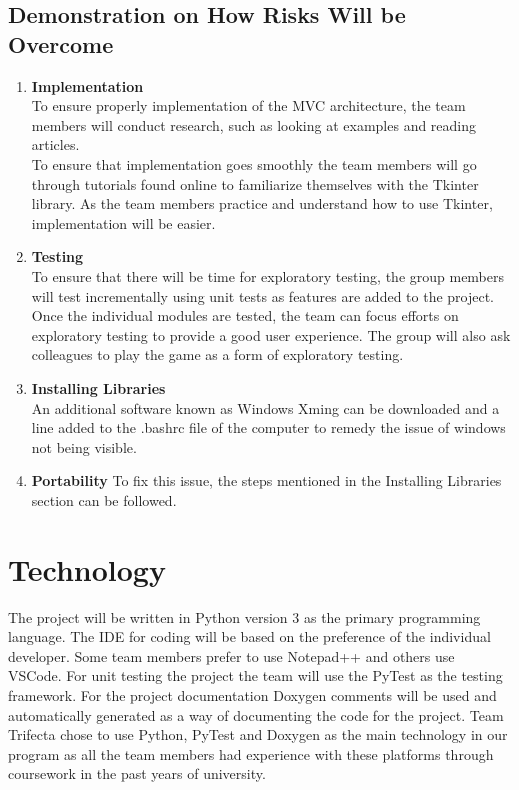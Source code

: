 \documentclass{article}
\begin{document}
\subsection{Demonstration on How Risks Will be Overcome}
\begin{enumerate}
    \item \textbf{Implementation}\\
    To ensure properly implementation of the MVC architecture, the team members will conduct research, such as looking at examples and reading articles. \\  
    To ensure that implementation goes smoothly the team members will go through tutorials found online to familiarize themselves with the Tkinter library. As the team members practice and understand how to use Tkinter, implementation will be easier.  
    \item \textbf{Testing}\\
    To ensure that there will be time for exploratory testing, the group members will test incrementally using unit tests as features are added to the project. Once the individual modules are tested, the team can focus efforts on exploratory testing to provide a good user experience. The group will also ask colleagues to play the game as a form of exploratory testing. \\
    \item \textbf{Installing Libraries}\\
     An additional software known as Windows Xming can be downloaded and a line added to the .bashrc file of the computer to remedy the issue of windows not being visible.  \\
    \item \textbf{Portability}
    To fix this issue, the steps mentioned in the Installing Libraries section can be followed.
\end{enumerate}

\section{Technology}
The project will be written in Python version 3 as the primary programming language. The IDE for coding will be based on the preference of the individual developer. Some team members prefer to use  Notepad++ and others use VSCode. For unit testing the project the team will use the PyTest as the testing framework. For the project documentation Doxygen comments will be used and automatically generated as a way of documenting the code for the project. Team Trifecta chose to use Python, PyTest and Doxygen as the main technology in our program as all the team members had experience with these platforms through coursework in the past years of university. 
\end{document}
